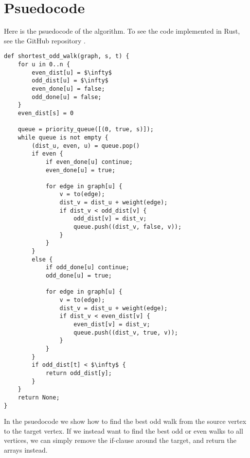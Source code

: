 \section{Psuedocode}
Here is the psuedocode of the algorithm. To see the code implemented in Rust, see the GitHub repository \cite{source:codebase}.

\begin{lstlisting}[caption={Shortest Odd Walk},label=Listing,mathescape=true]
def shortest_odd_walk(graph, s, t) {
    for u in 0..n {
        even_dist[u] = $\infty$
        odd_dist[u] = $\infty$
        even_done[u] = false;
        odd_done[u] = false;
    }
    even_dist[s] = 0

    queue = priority_queue([(0, true, s)]);
    while queue is not empty {
        (dist_u, even, u) = queue.pop()
        if even {
            if even_done[u] continue;
            even_done[u] = true;

            for edge in graph[u] {
                v = to(edge);
                dist_v = dist_u + weight(edge);
                if dist_v < odd_dist[v] {
                    odd_dist[v] = dist_v;
                    queue.push((dist_v, false, v));
                }
            }
        }
        else {
            if odd_done[u] continue;
            odd_done[u] = true;

            for edge in graph[u] {
                v = to(edge);
                dist_v = dist_u + weight(edge);
                if dist_v < even_dist[v] {
                    even_dist[v] = dist_v;
                    queue.push((dist_v, true, v));
                }
            }
        }
        if odd_dist[t] < $\infty$ {
            return odd_dist[y];
        }
    }
    return None;
}
\end{lstlisting}

In the psuedocode we show how to find the best odd walk from the source vertex to the target vertex. If we instead want to find the best odd or even walks to all vertices, we can simply remove the if-clause around the target, and return the arrays instead.
